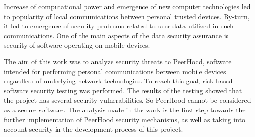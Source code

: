 %
Increase of computational power and emergence of new computer technologies led to popularity of local communications between personal trusted devices. 
%
By-turn, it led to emergence of security problems related to user data utilized in such communications. 
%
One of the main aspects of the data security assurance is security of software operating on mobile devices. 

%
The aim of this work was to analyze security threats to PeerHood, software intended for performing personal communications between mobile devices regardless of underlying network technologies. 
%
To reach this goal, risk-based software security testing was performed. 
%
The results of the testing showed that the project has several security vulnerabilities. 
%
So PeerHood cannot be considered as a secure software. 
%
The analysis made in the work is the first step towards the further implementation of PeerHood security mechanisms, as well as taking into account security in the development process of this project. 